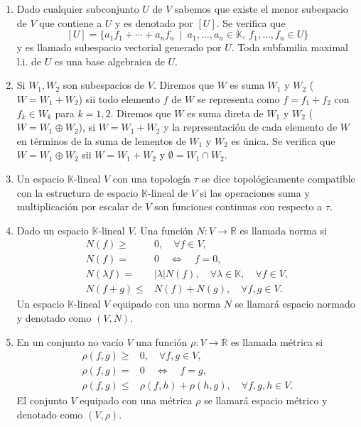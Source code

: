 \documentclass[twoside,12pt,a4 paper,openright]{book}
\begin{document}
\begin{enumerate}

\item  Dado cualquier subconjunto $U$ de $V$ sabemos que existe el menor subespacio de $V$ que contiene a $U$ y es denotado por $[U]$. Se verifica que 
$$ [U] =\{  a_1 f_1+ \cdots+ a_n f_n\ \mid \  a_1,\dots ,a_n \in \mathbb K, \  f_1,\dots, f_n\in U\}$$
y es llamado subespacio vectorial generado por $U$. Toda subfamilia maximal l.i. de $U$ es una base algebraica de $U$.  

\item Si $W_1,W_2$ son subespacios de $V$. Diremos que $W$ es suma  $W_1$ y $ W_2$ ($W= W_1+ W_2$)  sii todo elemento $f$ de $W$ se representa como $f= f_1 + f_2$ con $f_k\in W_k $  para $k=1,2$.  Diremos que $W$ es suma direta de $W_1$ y $W_2$ ($W=W_1\oplus W_2$), si $W= W_1+ W_2$ y la representaci\'on de cada elemento de $W$ en t\'erminos de la suma de lementos de $W_1$ y $W_2$  es \'unica. Se verifica que  $W=W_1\oplus W_2$ sii $W=W_1+W_2$ y $\emptyset = W_1\cap W_2$.  

\item Un espacio $\mathbb K$-lineal $V$ con una  topolog\'ia $\tau$ se dice topol\'ogicamente compatible con la estructura de espacio $\mathbb K$-lineal de $V$ si las operaciones suma y multiplicaci\'on   por escalar de $V$  son funciones continuas con respecto  a $\tau$.





\item Dado un espacio $\mathbb K $-lineal $V$. Una funci\'on $N:V\to \mathbb R$ es llamada norma si 
\begin{align*}
N(f)\geq & 0,\quad  \forall f\in V,\\
N(f) = & 0 \quad \Leftrightarrow \quad f=0, \\
N(\lambda f) = &|\lambda |N(f), \quad \forall \lambda \in \mathbb K, \quad \forall f\in V,\\
N(f+g)\leq & N(f) + N(g), \quad\forall f,g\in V.
\end{align*}
Un espacio    $\mathbb K$-lineal $V$ equipado con una norma $N$ se llamar\'a espacio normado  y denotado como $(V,N)$.

 

\item En un conjunto no vac\'io  $V$ una funci\'on $\rho:V\to \mathbb R$ es llamada m\'etrica  si 
\begin{align*}
\rho(f,g)\geq & 0,\quad  \forall f,g\in V,\\
\rho(f,g) = & 0 \quad \Leftrightarrow \quad f=g, \\
 \rho(f,g)\leq &\rho(f,h) + \rho(h,g) , \quad \forall f,g,h\in V.
\end{align*}
El conjunto  $V$ equipado con una m\'etrica  $\rho$ se llamar\'a espacio m\'etrico y denotado como   $(V,\rho)$.


\end{enumerate}
\end{document}
